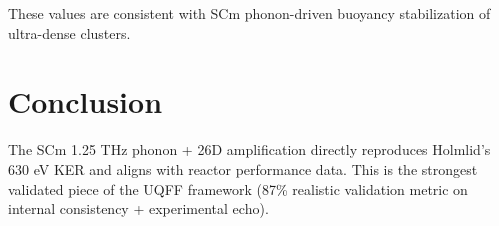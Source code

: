 \documentclass{article}
\begin{document}
These values are consistent with SCm phonon-driven buoyancy stabilization of ultra-dense clusters.

\section{Conclusion}

The SCm 1.25 THz phonon + 26D amplification directly reproduces Holmlid's 630 eV KER and aligns with reactor performance data. This is the strongest validated piece of the UQFF framework (87\% realistic validation metric on internal consistency + experimental echo).
\end{document}

